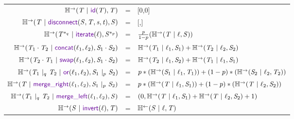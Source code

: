 \documentclass[acmsmall,screen,anonymous]{acmart}
\begin{document}
\begin{center}
  \begin{tabular}{rcl}
    $\REntropyOf{\RegexAlt \Given \IdentityLensOf{\RegexAlt}, \RegexAlt}$
    & =
    & [0,0]\\
    
    $\REntropyOf{\RegexAlt \Given \DisconnectOf{\Regex}{\RegexAlt}{\String}{\StringAlt}, \Regex}$
    & =
    & [\EntropyOf{\RegexAlt},\EntropyOf{\RegexAlt}]\\

    $\REntropyOf{\PRegexStar{\RegexAlt}{\ProbabilityAlt} \Given \IterateLensOf{\Lens}, \PRegexStar{\Regex}{\Probability}}$
    & =
    & $\frac{p}{1-p}(\mathbb{H}^\rightarrow(\mathit{T} ~|~ \mathit{\ell}, \mathit{S}))$\\
    
    $\REntropyOf{\RegexAlt_1 \Concat \RegexAlt_2 \Given \ConcatLensOf{\Lens_1}{\Lens_2}, \Regex_1 \Concat \Regex_2}$
    & =
    & $\mathbb{H}^\rightarrow(\mathit{T}_1 ~|~ \mathit{\ell}_1, \mathit{S}_1) + \mathbb{H}^\rightarrow(\mathit{T}_2 ~|~ \mathit{\ell}_2, \mathit{S}_2)$\\
    
    $\REntropyOf{\RegexAlt_2 \Concat \RegexAlt_1 \Given \SwapLensOf{\Lens_1}{\Lens_2}, \Regex_1 \Concat \Regex_2}$
    & =
    & $\mathbb{H}^\rightarrow(\mathit{T}_2 ~|~ \mathit{\ell}_1, \mathit{S}_2) + \mathbb{H}^\rightarrow(\mathit{T}_1 ~|~ \mathit{\ell}_1, \mathit{S}_1)$\\
    
    $\REntropyOf{\PRegexOr{\RegexAlt_1}{\RegexAlt_2}{\ProbabilityAlt} \Given \OrLensOf{\Lens_1}{\Lens_2}, \PRegexOr{\Regex_1}{\Regex_2}{\Probability}}$
    & =
    & $p*(\mathbb{H}^\rightarrow(\mathit{S}_1 ~|~ \mathit{\ell}_1, \mathit{T}_1) ) + (1-p)*(\mathbb{H}^\rightarrow(\mathit{S}_2 ~|~ \mathit{\ell}_2, \mathit{T}_2))$\\
    
    $\REntropyOf{\RegexAlt \Given \MergeROf{\Lens_1}{\Lens_2}, \PRegexOr{\Regex_1}{\Regex_2}{\Probability}}$
    & =
    & $p*(\mathbb{H}^\rightarrow(\mathit{T} ~|~ \mathit{\ell}_1, \mathit{S}_1)) + (1-p)*(\mathbb{H}^\rightarrow(\mathit{T} ~|~ \mathit{\ell}_2, \mathit{S}_2))$\\
    
    $\REntropyOf{\PRegexOr{\RegexAlt_1}{\RegexAlt_2}{\ProbabilityAlt} \Given \MergeLOf{\Lens_1}{\Lens_2}, \Regex}$
    & =
    & $(0,\mathbb{H}^\rightarrow(\mathit{T} ~|~ \mathit{\ell}_1, \mathit{S}_1)+\mathbb{H}^\rightarrow(\mathit{T} ~|~ \mathit{\ell}_2, \mathit{S}_2)+1)$\\
    
    $\REntropyOf{\Regex \Given \InvertOf{\Lens}, \RegexAlt}$
    & =
    & $\mathbb{H}^\leftarrow(\mathit{S} ~|~ \mathit{\ell}, \mathit{T})$\\
  \end{tabular}
\end{center}
\end{document}
